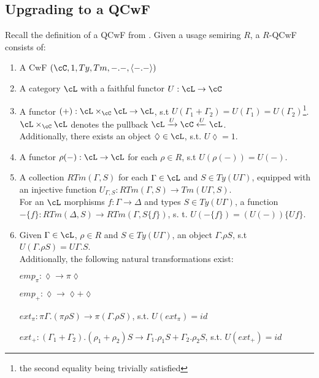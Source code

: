 \documentclass[12pt,a4paper]{article}
\begin{document}
\subsection*{Upgrading to a QCwF}
Recall the definition of a QCwF from \cite{Atkey2018}.
Given a usage semiring $R$, a $R$-QCwF consists of:
\begin{enumerate}[noitemsep]
  \item A CwF $(\cC, 1, Ty, Tm, -.-, \langle-.-\rangle)$
  
  \item A category $\cL$ with a faithful functor $U : \cL \to \cC$
  
  \item A functor $(+) : \cL \times_\cC \cL \to \cL$, s.t $U(\Gamma_1 + \Gamma_2) = U(\Gamma_1) = U(\Gamma_2)$\footnote{the second equality being trivially satisfied}. $\cL \times_\cC \cL$ denotes the pullback $\cL \xrightarrow{U} \cC \xleftarrow{U} \cL$.\\
  Additionally, there exists an object $\lozenge \in \cL$, s.t. $U\lozenge = 1$.
  
  \item A functor $\rho(-): \cL \to \cL$ for each $\rho \in R$, s.t $U(\rho(-)) = U(-)$.
  
  \item A collection $RTm(\Gamma, S)$ for each $\Gamma \in \cL$ and $S \in Ty(U\Gamma)$, equipped with an injective function $U_{\Gamma,S} : RTm(\Gamma, S) \to Tm(U\Gamma, S)$.\\
  For an $\cL$ morphisms $f: \Gamma \to \Delta$ and types $S \in Ty(U\Gamma)$, a function $-\{f\} : RTm(\Delta, S) \to RTm(\Gamma, S\{f\})$, s. t. $U(-\{f\}) = (U(-))\{Uf\}$.
         
  \item Given $\Gamma \in \cL$, $\rho \in R$ and $S \in Ty(U\Gamma)$, an object $\Gamma. \rho S$, s.t $U(\Gamma. \rho S) = U\Gamma.S$.\\
  Additionally, the following natural transformations exist:
  
  \subitem $emp_\pi : \lozenge \to \pi\lozenge$
  
  \subitem $emp_+ : \lozenge \to \lozenge + \lozenge$
  
  \subitem $ext_\pi : \pi\Gamma. (\pi\rho S) \to \pi(\Gamma. \rho S)$, s.t. $U(ext_\pi) = id$ 
  
  \subitem $ext_+ : (\Gamma_1 + \Gamma_2).(\rho_1 + \rho_2)S \to \Gamma_1.\rho_1 S + \Gamma_2 . \rho_2 S$, s.t.  $U(ext_+) = id$ 
  

\end{enumerate}
\end{document}
